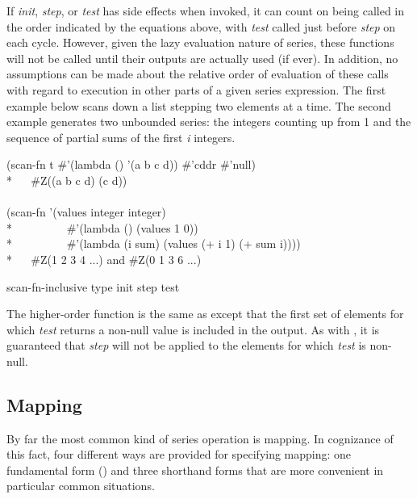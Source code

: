 \begin{defun}[Function]
If {\it init}, {\it step}, or {\it test} has side effects when
invoked, it can count on being called in the order indicated by the
equations above, with {\it test} called just before {\it step} on each
cycle.  However, given the lazy evaluation nature of series, these
functions will not be called until their outputs are actually used (if
ever).  In addition, no assumptions can be made about the relative order of
evaluation of these calls with regard to execution in other parts of a
given series expression.  The first example below scans down a list
stepping two elements at a time.  The second example generates two unbounded
series: the integers counting up from 1 and the sequence of partial
sums of the first {\it i} integers.
\begin{lisp}
(scan-fn t \#'(lambda () '(a b c d)) \#'cddr \#'null) \\*
~~{\EV} \#Z((a b c d) (c d)) \\
\\
(scan-fn '(values integer integer) \\*
~~~~~~~~~\#'(lambda () (values 1 0)) \\*
~~~~~~~~~\#'(lambda (i sum) (values (+ i 1) (+ sum i)))) \\*
~~{\EV} \#Z(1 2 3 4 ...) {\rm and} \#Z(0 1 3 6 ...)
\end{lisp}
\end{defun}

\begin{defun}[Function]
scan-fn-inclusive type init step test

The higher-order function  is the same as 
 except that the first set of elements for which {\it test}
returns a non-null value is included in the output.  As with
, it is guaranteed that {\it step} will not be applied to the
elements for which {\it test} is non-null.
\end{defun}

\subsection{Mapping}

By far the most common kind of series operation is mapping.  In cognizance
of this fact, four different ways are provided for specifying mapping:  one
fundamental form () and three shorthand forms that are more
convenient in particular common situations.

